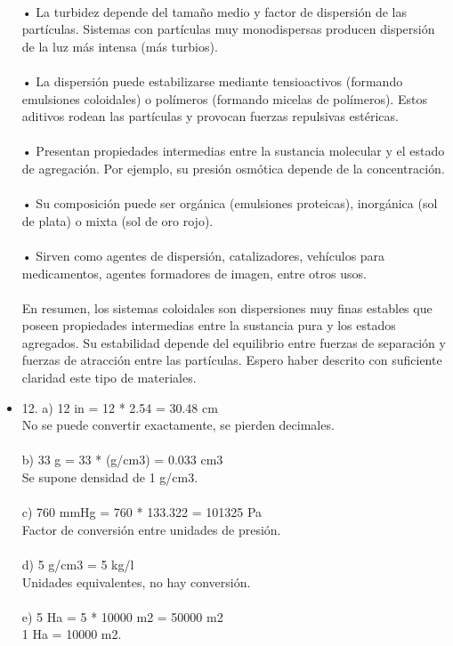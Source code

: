 \documentclass{article}
\begin{document}
\begin{itemize}
\\
• La turbidez depende del tamaño medio y factor de dispersión de las partículas. Sistemas con partículas muy monodispersas producen dispersión de la luz más intensa (más turbios).\\
\\
• La dispersión puede estabilizarse mediante tensioactivos (formando emulsiones coloidales) o polímeros (formando micelas de polímeros). Estos aditivos rodean las partículas y provocan fuerzas repulsivas estéricas.\\
\\
• Presentan propiedades intermedias entre la sustancia molecular y el estado de agregación. Por ejemplo, su presión osmótica depende de la concentración.\\
\\
• Su composición puede ser orgánica (emulsiones proteicas), inorgánica (sol de plata) o mixta (sol de oro rojo).\\
\\
• Sirven como agentes de dispersión, catalizadores, vehículos para medicamentos, agentes formadores de imagen, entre otros usos.\\
\\
En resumen, los sistemas coloidales son dispersiones muy finas estables que poseen propiedades intermedias entre la sustancia pura y los estados agregados. Su estabilidad depende del equilibrio entre fuerzas de separación y fuerzas de atracción entre las partículas. Espero haber descrito con suficiente claridad este tipo de materiales. \\
\item{12.}
a) 12 in = 12 * 2.54 = 30.48 cm\\
No se puede convertir exactamente, se pierden decimales.\\
\\
b) 33 g = 33 * (g/cm3) = 0.033 cm3\\
Se supone densidad de 1 g/cm3.\\
\\
c) 760 mmHg = 760 * 133.322 = 101325 Pa\\
Factor de conversión entre unidades de presión.\\
\\
d) 5 g/cm3 = 5 kg/l\\
Unidades equivalentes, no hay conversión.\\
\\
e) 5 Ha = 5 * 10000 m2 = 50000 m2\\
1 Ha = 10000 m2.\\

\end{itemize}
\end{document}
